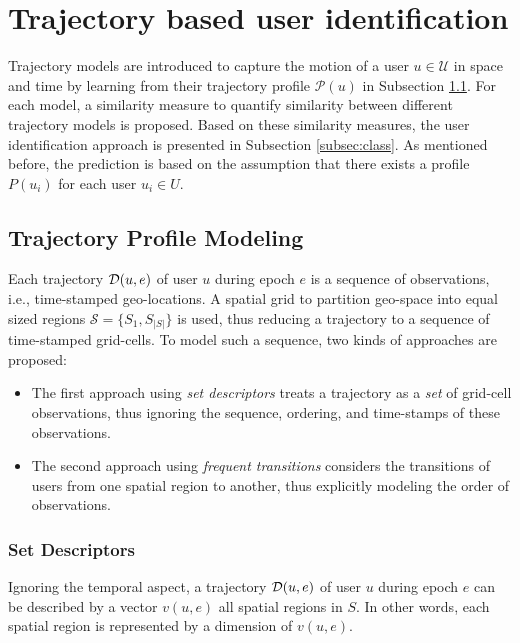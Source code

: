 
\chapter{Trajectory based user identification}
\label{sec:method}

Trajectory models are introduced to capture the motion of a user $u\in\mathcal{U}$ in space and time by learning from their trajectory profile $\mathcal{P}(u)$ in Subsection \ref{subsec:modeling}. For each model, a similarity measure to quantify similarity between different trajectory models is proposed. Based on these similarity measures, the user identification approach is presented in Subsection \ref{subsec:class}. As mentioned before, the prediction is based on the assumption that there exists a profile $P(u_i)$ for each user $u_i \in U$.

\section{Trajectory Profile Modeling}\label{subsec:modeling}
Each trajectory $\mathcal{\mathcal{D}}(u, e)$ of user $u$ during epoch $e$ is a sequence of observations, i.e., time-stamped geo-locations. A spatial grid to partition geo-space into equal sized regions $\mathcal{S}=\{S_1,S_{|S|}\}$ is used, thus reducing a trajectory to a sequence of time-stamped grid-cells. To model such a sequence, two kinds of approaches are proposed:
\begin{itemize}
\item The first approach using \emph{set descriptors} treats a trajectory as a \emph{set} of grid-cell observations, thus ignoring the sequence, ordering, and time-stamps of these observations.
\item The second approach using \emph{frequent transitions} considers the transitions of users from one spatial region to another, thus explicitly modeling the order of observations.
\end{itemize}

\subsection{Set Descriptors}\label{subsubsec:set}
Ignoring the temporal aspect, a trajectory $\mathcal{D}(u, e)$ of user $u$ during epoch $e$ can be described by a vector $v(u,e)$ all spatial regions in $S$. In other words, each spatial region is represented by a dimension of $v(u,e)$.

